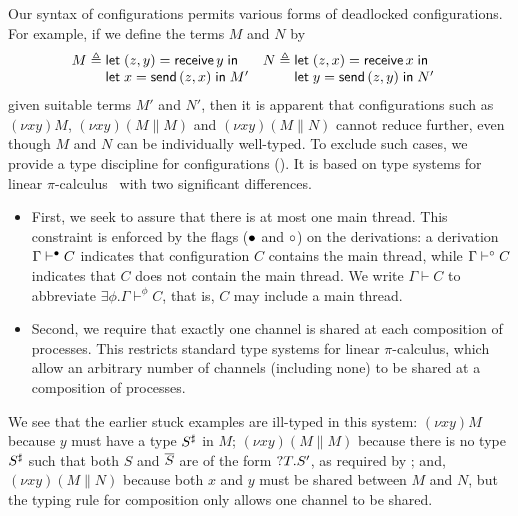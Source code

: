 \documentclass[oribibl,orivec,envcountsame]{llncs}
\begin{document}
Our syntax of configurations permits various forms of deadlocked configurations.  For example, if we
define the terms $M$ and $N$ by
\begin{align*}
  M &\defeq \bl
    \gvlet{(z,y)}{\gvreceive{y}}{} \\
    \gvlet{x}{\gvsend{(z,x)}}{M'} \el &
  N &\defeq \bl
    \gvlet{(z,x)}{\gvreceive{x}}{} \\
    \gvlet{y}{\gvsend{(z,y)}}{N'} \el
\end{align*}
given suitable terms $M'$ and $N'$, then it is apparent that configurations such as $(\nu xy)M$,
$(\nu xy)(M \parallel M)$ and $(\nu xy)(M \parallel N)$ cannot reduce further, even though $M$ and
$N$ can be individually well-typed.  To exclude such cases, we provide a type discipline for
configurations (). It is based on type systems for linear
$\pi$-calculus~\cite{Kobayashi96} with two significant differences.
\begin{itemize}
\item First, we seek to assure that there is at most one main thread. This constraint is enforced by
  the flags (${\mathord{\bullet}}$ and ${\mathord{\circ}}$) on the derivations: a derivation $\Gamma \vdash^{\mathord{\bullet}} C$
  indicates that configuration $C$ contains the main thread, while $\Gamma \vdash^{\mathord{\circ}} C$
  indicates that $C$ does not contain the main thread. We write $\Gamma \vdash C$ to abbreviate
  $\exists \phi.\Gamma \vdash^\phi C$, that is, $C$ may include a main thread.
\item Second, we require that exactly one channel is shared at each composition of processes. This
  restricts standard type systems for linear $\pi$-calculus, which allow an arbitrary number of
  channels (including none) to be shared at a composition of processes.
\end{itemize}
We see that the earlier stuck examples are ill-typed in this system: $(\nu xy)M$ because $y$ must
have a type $S^\sharp$ in $M$; $(\nu xy)(M \parallel M)$ because there is no type $S^\sharp$
such that both $S$ and $\overline{S}$ are of the form ${?T.S'}$, as required by
; and, $(\nu xy)(M \parallel N)$ because both $x$ and $y$ must be shared between
$M$ and $N$, but the typing rule for composition only allows one channel to be shared.
\end{document}
